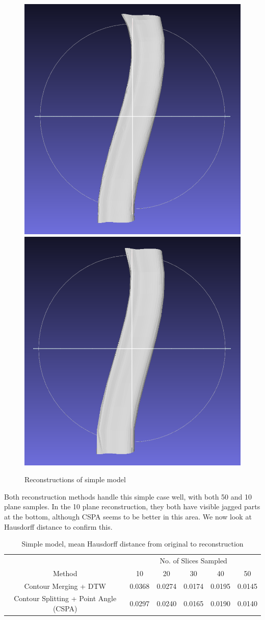 \documentclass[11p, titlepage]{article}
\newcommand{\reconstructionright}{0.67}
\begin{document}
\begin{figure}[h!]
\begin{minipage}[b]{\reconstructionright\linewidth}
       \hfill
       {\includegraphics[width=.48\linewidth]{reconstructions/cspa50-simple-50}}%
       \hfill
       {\includegraphics[width=.48\linewidth]{reconstructions/cspa50-simple-10}}
     \end{minipage}%
        \caption{Reconstructions of simple model}
        \label{fig:simple_reconstructions}
\end{figure}

Both reconstruction methods handle this simple case well, with both 50 and 10 plane samples. In the 10 plane reconstruction, they both have visible jagged parts at the bottom, although CSPA seems to be better in this area. We now look at Hausdorff distance to confirm this.

\begin{table}[h!]
\begin{tabular}{ | c | c | c | c | c | c | }
\hline
& \multicolumn{5}{c|}{No. of Slices Sampled} \\
\cline{2-6}
Method & 10 & 20 & 30 & 40 & 50 \\
\hline
Contour Merging + DTW & 0.0368 & 0.0274 & 0.0174 & 0.0195 & 0.0145 \\
Contour Splitting + Point Angle (CSPA) & 0.0297 & 0.0240 & 0.0165 & 0.0190 & 0.0140 \\
\hline
\end{tabular}
\caption{Simple model, mean Hausdorff distance from original to reconstruction}
\label{table:simple_forward}
\end{table}
\end{document}
